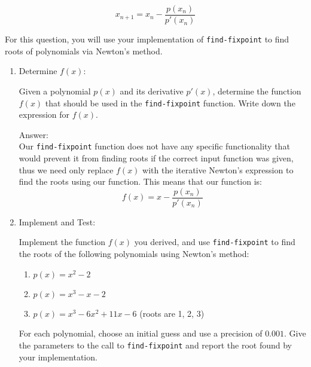 \documentclass[12pt,letterpaper]{ntdhw}
\begin{document}
\begin{enumerate}
    \[
    x_{n+1} = x_n - \frac{p(x_n)}{p'(x_n)}
    \]

    For this question, you will use your implementation of {\tt find-fixpoint} to find roots of polynomials via Newton's method.
  \begin{enumerate}
    \item Determine \( f(x) \):

    Given a polynomial \( p(x) \) and its derivative \( p'(x) \), determine the function \( f(x) \) that should be used in the {\tt find-fixpoint} function. Write down the expression for \( f(x) \).

    \begin{emph}
      Answer:
      \\ Our {\tt find-fixpoint} function does not have any specific functionality that would prevent it from finding roots if the correct input function was given, thus we need only replace \(f(x) \) with the iterative Newton's expression to find the roots using our function. This means that our function is:
      \[
    f(x) = x - \frac{p(x_n)}{p'(x_n)}
    \]
    \end{emph}

    \item Implement and Test:

    Implement the function \( f(x) \) you derived, and use {\tt find-fixpoint} to find the roots of the following polynomials using Newton's method:
    \begin{enumerate}
      \item \( p(x) = x^2 - 2 \)
      \item \( p(x) = x^3 - x - 2 \)
      \item \( p(x) = x^3 - 6x^2 + 11x - 6 \) (roots are 1, 2, 3)
    \end{enumerate}

    For each polynomial, choose an initial guess and use a precision of \( 0.001 \). Give the parameters to the call to {\tt find-fixpoint} and report the root found by your implementation.


\end{enumerate}
\end{enumerate}
\end{document}
